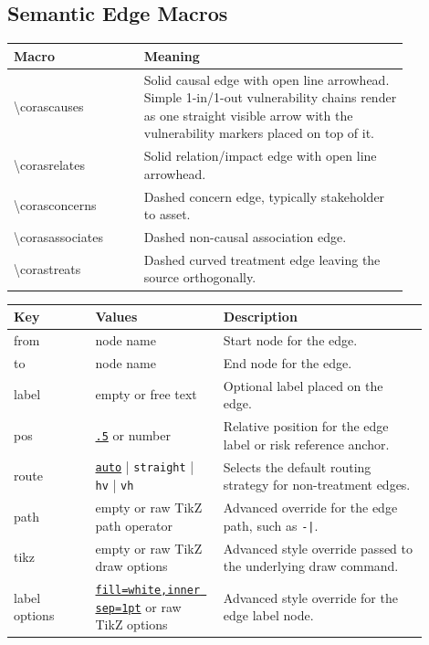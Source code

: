 \documentclass[a4paper]{article}
\newcommand{\keydefault}[1]{\underline{\texttt{#1}}}
\begin{document}
\subsection{Semantic Edge Macros}

\begin{center}
\begin{tabular}{>{\ttfamily}p{0.28\linewidth}p{0.58\linewidth}}
\hline
Macro & Meaning \\
\hline
\textbackslash corascauses & Solid causal edge with open line arrowhead. Simple 1-in/1-out vulnerability chains render as one straight visible arrow with the vulnerability markers placed on top of it. \\
\textbackslash corasrelates & Solid relation/impact edge with open line arrowhead. \\
\textbackslash corasconcerns & Dashed concern edge, typically stakeholder to asset. \\
\textbackslash corasassociates & Dashed non-causal association edge. \\
\textbackslash corastreats & Dashed curved treatment edge leaving the source orthogonally. \\
\hline
\end{tabular}
\end{center}

\begin{center}
\begin{tabular}{>{\ttfamily}p{0.18\linewidth}p{0.27\linewidth}p{0.45\linewidth}}
\hline
Key & Values & Description \\
\hline
from & node name & Start node for the edge. \\
to & node name & End node for the edge. \\
label & empty or free text & Optional label placed on the edge. \\
pos & \keydefault{.5} or number & Relative position for the edge label or risk reference anchor. \\
route & \keydefault{auto} | \texttt{straight} | \texttt{hv} | \texttt{vh} & Selects the default routing strategy for non-treatment edges. \\
path & empty or raw TikZ path operator & Advanced override for the edge path, such as \texttt{-|}. \\
tikz & empty or raw TikZ draw options & Advanced style override passed to the underlying draw command. \\
label options & \keydefault{fill=white,inner sep=1pt} or raw TikZ options & Advanced style override for the edge label node. \\
\hline
\end{tabular}
\end{center}
\end{document}
